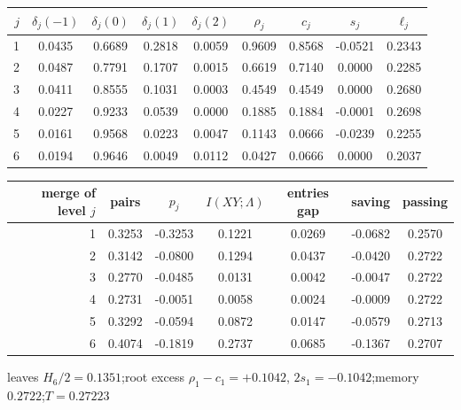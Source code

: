 \begin{tabular}{rcccccccc}
\toprule
$j$ & $\delta_j(-1)$ & $\delta_j(0)$ & $\delta_j(1)$ & $\delta_j(2)$ & $\rho_j$ & $c_j$ & $s_j$ & $\ell_j$ \\
\midrule
1 & 0.0435 & 0.6689 & 0.2818 & 0.0059 & 0.9609 & 0.8568 & -0.0521 & 0.2343 \\
2 & 0.0487 & 0.7791 & 0.1707 & 0.0015 & 0.6619 & 0.7140 & 0.0000 & 0.2285 \\
3 & 0.0411 & 0.8555 & 0.1031 & 0.0003 & 0.4549 & 0.4549 & 0.0000 & 0.2680 \\
4 & 0.0227 & 0.9233 & 0.0539 & 0.0000 & 0.1885 & 0.1884 & -0.0001 & 0.2698 \\
5 & 0.0161 & 0.9568 & 0.0223 & 0.0047 & 0.1143 & 0.0666 & -0.0239 & 0.2255 \\
6 & 0.0194 & 0.9646 & 0.0049 & 0.0112 & 0.0427 & 0.0666 & 0.0000 & 0.2037 \\
\bottomrule
\end{tabular}

\medskip

\begin{tabular}{rcccccc}
\toprule
merge of level $j$ & pairs & $p_j$ & $I(XY;\Lambda)$ & entries gap & saving & passing \\
\midrule
1 & 0.3253 & -0.3253 & 0.1221 & 0.0269 & -0.0682 & 0.2570 \\
2 & 0.3142 & -0.0800 & 0.1294 & 0.0437 & -0.0420 & 0.2722 \\
3 & 0.2770 & -0.0485 & 0.0131 & 0.0042 & -0.0047 & 0.2722 \\
4 & 0.2731 & -0.0051 & 0.0058 & 0.0024 & -0.0009 & 0.2722 \\
5 & 0.3292 & -0.0594 & 0.0872 & 0.0147 & -0.0579 & 0.2713 \\
6 & 0.4074 & -0.1819 & 0.2737 & 0.0685 & -0.1367 & 0.2707 \\
\bottomrule
\end{tabular}

\smallskip
{\footnotesize leaves $H_6/2 = 0.1351$;\quad root excess $\rho_1-c_1 = +0.1042$, $2s_1 = -0.1042$;\quad memory $0.2722$;\quad $T = 0.27223$}

